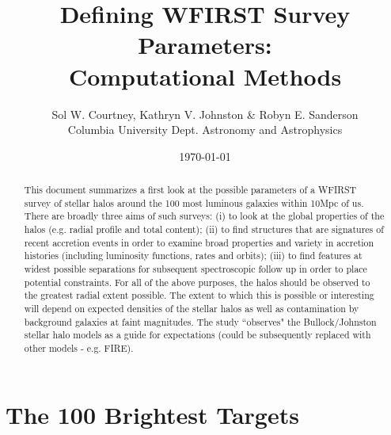 \documentclass[11pt,a4paper,fleqn,notitlepage,oneside]{article}
\title{Defining WFIRST Survey Parameters: \\ Computational Methods}
\author{Sol W. Courtney, Kathryn V. Johnston \& Robyn E. Sanderson \\ Columbia University Dept. Astronomy and Astrophysics}
\date{\today}
\begin{document}
\maketitle


\begin{abstract}

	This document summarizes a first look at the possible parameters of a WFIRST survey of stellar halos around the 100 most luminous galaxies within 10Mpc of us. 
	There are broadly three aims of such surveys: (i) to look at the global properties of the halos (e.g. radial profile and total content); (ii) to find structures that are signatures of recent accretion events in order to examine broad properties and variety in accretion histories (including luminosity functions, rates and orbits); (iii) to find features at widest possible separations for subsequent spectroscopic follow up in order to place potential constraints.
	For all of the above purposes, the halos should be observed to the greatest radial extent possible.
	The extent to which this is possible or interesting will depend on expected densities of the stellar halos as well as contamination by background galaxies at faint magnitudes.
	The study “observes" the Bullock/Johnston stellar halo models as a guide for expectations (could be subsequently replaced with other models - e.g. FIRE).

\end{abstract}


\section{The 100 Brightest Targets} %
	\label{sec:the_100_brightest_targets}
\end{document}
